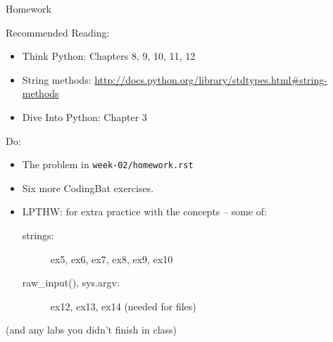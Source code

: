 \documentclass{beamer}
\begin{document}
\begin{frame}[fragile]{Homework}

Recommended Reading:
\begin{itemize}
  \item Think Python: Chapters 8, 9, 10, 11, 12
  \item String methods: \url{http://docs.python.org/library/stdtypes.html#string-methods}
  \item Dive Into Python: Chapter 3
\end{itemize}

Do:
\begin{itemize}
    \item The problem in \verb|week-02/homework.rst| 
    \item Six more CodingBat exercises.
    \item LPTHW: for extra practice with the concepts -- some of:
    \begin{description}
        \item[strings:] ex5, ex6, ex7, ex8, ex9, ex10
        \item[raw\_input(), sys.argv:] ex12, ex13, ex14 (needed for files)
    \end{description}    
\end{itemize}

\vfill
(and any labs you didn't finish in class)

\end{frame}
\end{document}
